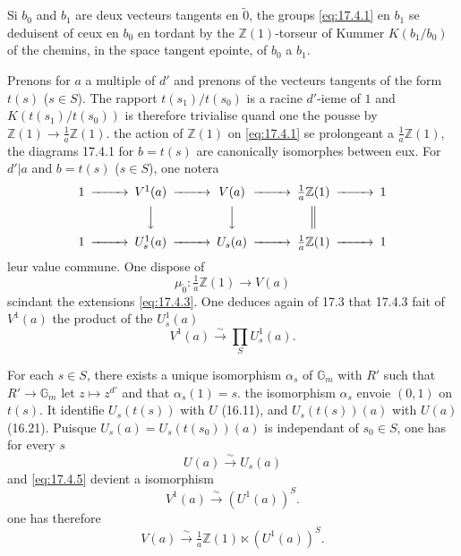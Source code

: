 \documentclass[12pt,a4paper]{article}
\theoremstyle{plain}
\theoremstyle{definition}
\theoremstyle{remark}
\newcommand{\Gm}{\mathbb{G}_m}
\newcommand{\ZZ}{\mathbb{Z}}
\begin{document}
Si $b_0$ and $b_1$ are deux vecteurs tangents en $\tilde{0}$, the
groups \eqref{eq:17.4.1} en $b_1$ se deduisent of ceux en $b_0$ en
tordant by the $\ZZ(1)$-torseur of Kummer $K(b_1/b_0)$ of the chemins,
in the space tangent epointe, of $b_0$ a $b_1$.

Prenons for $a$ a multiple of $d'$ and prenons of the vecteurs tangents
of the form $t(s)$ ($s \in S$). The rapport $t(s_1)/t(s_0)$ is a
racine $d'$-ieme of $1$ and $K(t(s_1)/t(s_0))$ is therefore trivialise
quand one the pousse by $\ZZ(1) \to \frac{1}{a}\ZZ(1)$. the action of
$\ZZ(1)$ on \eqref{eq:17.4.1} se prolongeant a
$\frac{1}{a}\ZZ(1)$, the diagrams 17.4.1 for $b = t(s)$ are
canonically isomorphes between eux. For $d' | a$ and $b = t(s)$
($s \in S$), one notera
\begin{equation}\label{eq:17.4.3}
\begin{CD}
1 @>>> V^1(a) @>>> V(a) @>>> \frac{1}{a}\ZZ(1) @>>> 1 \\
@. @VVV @VVV @| \\
1 @>>> U_s^1(a) @>>> U_s(a) @>>> \frac{1}{a}\ZZ(1) @>>> 1
\end{CD}
\end{equation}
leur value commune. One dispose of
\begin{equation}\label{eq:17.4.4}
\mu_{\tilde{0}} : \tfrac{1}{a}\ZZ(1) \to V(a)
\end{equation}
scindant the extensions \eqref{eq:17.4.3}. One deduces again of 17.3
that 17.4.3 fait of $V^1(a)$ the product of the $U_s^1(a)$
\begin{equation}\label{eq:17.4.5}
V^1(a) \xrightarrow{\sim} \prod_S U_s^1(a).
\end{equation}

For each $s \in S$, there exists a unique isomorphism $\alpha_s$ of
$\Gm$ with $R'$ such that $R' \to \Gm$ let $z \mapsto z^{d'}$ and that
$\alpha_s(1) = s$. the isomorphism $\alpha_s$ envoie $(0,1)$ on
$t(s)$. It identifie $U_s(t(s))$ with $U$ (16.11), and
$U_s(t(s))(a)$ with $U(a)$ (16.21). Puisque
$U_s(a) = U_s(t(s_0))(a)$ is independant of $s_0 \in S$, one has for every $s$
\[
U(a) \xrightarrow{\sim} U_s(a)
\]
and \eqref{eq:17.4.5} devient a isomorphism
\begin{equation}\label{eq:17.4.6}
V^1(a) \xrightarrow{\sim} (U^1(a))^S.
\end{equation}
one has therefore
\begin{equation}\label{eq:17.4.7}
V(a) \xrightarrow{\sim} \tfrac{1}{a}\ZZ(1) \ltimes (U^1(a))^S.
\end{equation}
\end{document}
